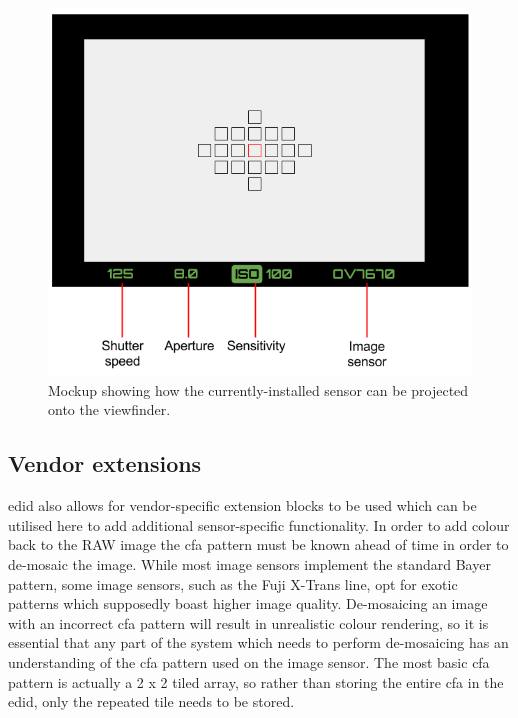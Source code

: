 \begin{figure}
  \centering
  \includegraphics[width=1\textwidth]{./img/viewfinder.png}
  \caption{Mockup showing how the currently-installed sensor can be projected onto the viewfinder.}
  \label{fig:viewfinder}
\end{figure}

\subsection{Vendor extensions}
\gls{edid} also allows for vendor-specific extension blocks to be used which can be utilised here to add additional sensor-specific functionality. In order to add colour back to the RAW image the \gls{cfa} pattern must be known ahead of time in order to de-mosaic the image. While most image sensors implement the standard Bayer pattern, some image sensors, such as the Fuji X-Trans line, opt for exotic patterns which supposedly boast higher image quality. De-mosaicing an image with an incorrect \gls{cfa} pattern will result in unrealistic colour rendering, so it is essential that any part of the system which needs to perform de-mosaicing has an understanding of the \gls{cfa} pattern used on the image sensor. The most basic \gls{cfa} pattern is actually a 2 x 2 tiled array, so rather than storing the entire \gls{cfa} in the \gls{edid}, only the repeated tile needs to be stored.
